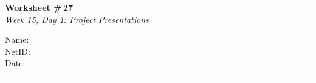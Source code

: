 \documentclass[11pt]{article}
\begin{document}
\noindent
\begin{minipage}[t]{0.55\textwidth}
  \vspace{0pt}
  {\LARGE \textbf{Worksheet \#\,27}} \\[0.3em]
  {\large \textit{Week 15, Day 1: Project Presentations}}
\end{minipage}
\hfill
\begin{minipage}[t]{0.40\textwidth}
  \vspace{0pt}
  \begin{mdframed}[linecolor=black, linewidth=1pt, innertopmargin=10pt, innerbottommargin=10pt]
    \small
    \vspace{0.4cm}
    Name: \underline{\hspace{4.5cm}} \\[1em]
    NetID: \underline{\hspace{4.3cm}} \\[1em]
    Date: \underline{\hspace{4.4cm}} \\
  \end{mdframed}
\end{minipage}

\vspace{1em}
\noindent\rule{\linewidth}{1pt}
\vspace{0.2em}
\end{document}
